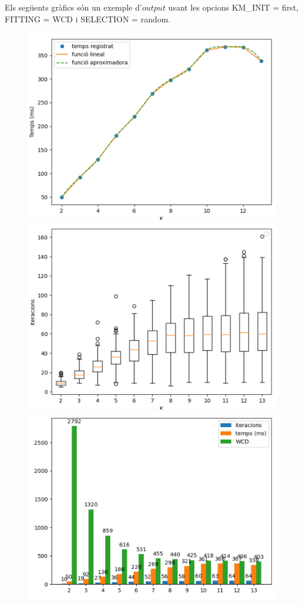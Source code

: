 \documentclass[a4paper, 11pt]{article}
\begin{document}
\newpage
\hspace{-1.5em}Els següents gràfics són un exemple d'$output$ usant les opcions KM\_INIT = first, FITTING = WCD i SELECTION = random.
\begin{figure}[h!]
\begin{minipage}{.3\textwidth}
  \centering
  \includegraphics[width=.9\linewidth]{def_temps.png}
\end{minipage}%
\begin{minipage}{.3\textwidth}
  \centering
  \includegraphics[width=.9\linewidth]{def_iter.png}
\end{minipage}
\begin{minipage}{.3\textwidth}
  \centering
  \includegraphics[width=.9\linewidth]{def_barras.png}

\end{minipage}
\end{figure}
\end{document}
